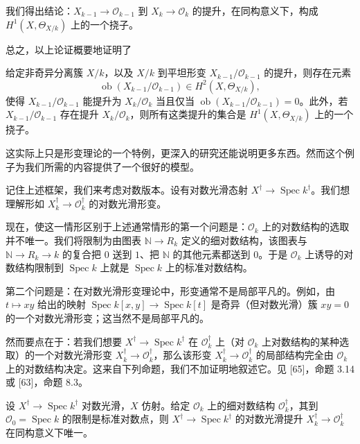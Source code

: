 我们得出结论：$X_{k-1}\to\mathcal{O}_{k-1}$ 到 $X_k\to\mathcal{O}_k$ 的提升，在同构意义下，构成 $H^1(X,\Theta_{X/k})$ 上的一个挠子。

总之，以上论证概要地证明了

\begin{proposition}
给定非奇异分离簇 $X/k$，以及 $X/k$ 到平坦形变 $X_{k-1}/\mathcal{O}_{k-1}$ 的提升，则存在元素
\[
  \operatorname{ob}(X_{k-1}/\mathcal{O}_{k-1})\in H^2(X,\Theta_{X/k}),
\]
使得 $X_{k-1}/\mathcal{O}_{k-1}$ 能提升为 $X_k/\mathcal{O}_k$ 当且仅当 $\operatorname{ob}(X_{k-1}/\mathcal{O}_{k-1})=0$。此外，若 $X_{k-1}/\mathcal{O}_{k-1}$ 存在提升 $X_k/\mathcal{O}_k$，则所有这类提升的集合是 $H^1(X,\Theta_{X/k})$ 上的一个挠子。
\end{proposition}

这实际上只是形变理论的一个特例，更深入的研究还能说明更多东西。然而这个例子为我们所需的内容提供了一个很好的模型。

记住上述框架，我们来考虑对数版本。设有对数光滑态射 $X^{\dagger}\to\operatorname{Spec} k^{\dagger}$。我们想理解形如 $X_k^{\dagger}\to\mathcal{O}_k^{\dagger}$ 的对数光滑形变。

现在，使这一情形区别于上述通常情形的第一个问题是：$\mathcal{O}_k$ 上的对数结构的选取并不唯一。我们将限制为由图表 $\mathbb{N}\to R_k$ 定义的细对数结构，该图表与 $\mathbb{N}\to R_k\to k$ 的复合把 $0$ 送到 $1$、把 $\mathbb{N}$ 的其他元素都送到 $0$。于是 $\mathcal{O}_k$ 上诱导的对数结构限制到 $\operatorname{Spec} k$ 上就是 $\operatorname{Spec} k$ 上的标准对数结构。

第二个问题是：在对数光滑形变理论中，形变通常不是局部平凡的。例如，由 $t\mapsto xy$ 给出的映射 $\operatorname{Spec} k[x,y]\to\operatorname{Spec} k[t]$ 是奇异（但对数光滑）簇 $xy=0$ 的一个对数光滑形变；这当然不是局部平凡的。

然而要点在于：若我们想要 $X^{\dagger}\to\operatorname{Spec} k^{\dagger}$ 在 $\mathcal{O}_k^{\dagger}$ 上（对 $\mathcal{O}_k$ 上对数结构的某种选取）的一个对数光滑形变 $X_k^{\dagger}\to\mathcal{O}_k^{\dagger}$，那么该形变 $X_k^{\dagger}\to\mathcal{O}_k^{\dagger}$ 的局部结构完全由 $\mathcal{O}_k$ 上的对数结构决定。这来自下列命题，我们不加证明地叙述它。见 [65]，命题 3.14 或 [63]，命题 8.3。

\begin{proposition}
设 $X^{\dagger}\to\operatorname{Spec} k^{\dagger}$ 对数光滑，$X$ 仿射。给定 $\mathcal{O}_k$ 上的细对数结构 $\mathcal{O}_k^{\dagger}$，其到 $\mathcal{O}_0=\operatorname{Spec} k$ 的限制是标准对数点，则 $X^{\dagger}\to\operatorname{Spec} k^{\dagger}$ 的对数光滑提升 $X_k^{\dagger}\to\mathcal{O}_k^{\dagger}$ 在同构意义下唯一。
\end{proposition}

